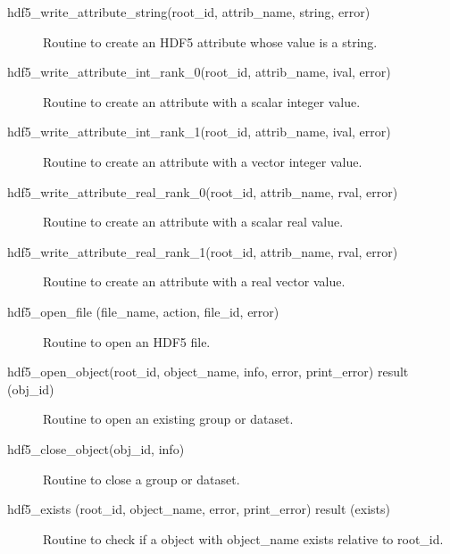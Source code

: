 \begin{description}

\label{r:hdf5.write.attribute.string}
\item[hdf5_write_attribute_string(root_id, attrib_name, string, error)] \Newline 
Routine to create an HDF5 attribute whose value is a string.

\label{r:hdf5.write.attribute.int.rank.0}
\item[hdf5_write_attribute_int_rank_0(root_id, attrib_name, ival, error)] \Newline 
Routine to create an attribute with a scalar integer value.

\label{r:hdf5.write.attribute.int.rank.1}
\item[hdf5_write_attribute_int_rank_1(root_id, attrib_name, ival, error)] \Newline 
Routine to create an attribute with a vector integer value.

\label{r:hdf5.write.attribute.real.rank.0}
\item[hdf5_write_attribute_real_rank_0(root_id, attrib_name, rval, error)] \Newline 
Routine to create an attribute with a scalar real value.

\label{r:hdf5.write.attribute.real.rank.1}
\item[hdf5_write_attribute_real_rank_1(root_id, attrib_name, rval, error)] \Newline 
Routine to create an attribute with a real vector value.

\label{r:hdf5.open.file}
\item[hdf5_open_file (file_name, action, file_id, error)] \Newline 
Routine to open an HDF5 file.

\label{r:hdf5.open.object}
\item[hdf5_open_object(root_id, object_name, info, error, print_error) result (obj_id)] \Newline 
Routine to open an existing group or dataset.

\label{r:hdf5.close.object}
\item[hdf5_close_object(obj_id, info)] \Newline 
Routine to close a group or dataset.

\label{r:hdf5.exists}
\item[hdf5_exists (root_id, object_name, error, print_error) result (exists)] \Newline 
Routine to check if a object with object_name exists relative to root_id.


\end{description}
